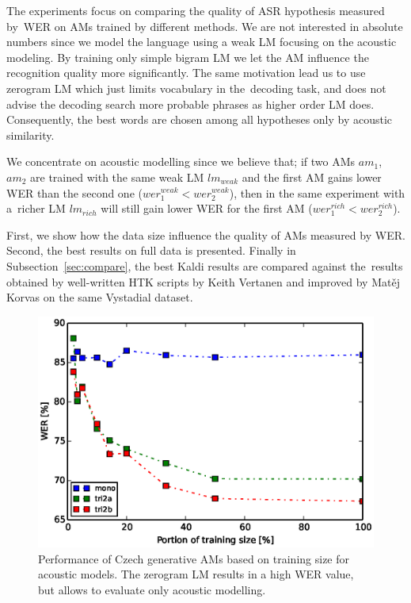 The experiments focus on comparing the quality of ASR hypothesis measured by~\ac{WER} on \acp{AM} trained by different methods.
We are not interested in absolute numbers since we model the language using a weak \ac{LM} focusing on the acoustic modeling.
By training only simple bigram \ac{LM} we let the \ac{AM} influence the recognition quality more significantly. 
The same motivation lead us to use zerogram \ac{LM} which just limits vocabulary in the~decoding task, and does not advise the decoding search more probable phrases as higher order \ac{LM} does.
Consequently, the best words are chosen among all hypotheses only by acoustic similarity.

We concentrate on acoustic modelling since we believe that; if two \acp{AM} $am_1$, $am_2$ are trained with the same weak \acl{LM} $lm_{weak}$ and the first \ac{AM} gains lower \ac{WER} than the second one ($wer^{weak}_{1} <  wer^{weak}_{2}$), then in the same experiment with a~richer \ac{LM} $lm_{rich}$ will still gain lower \ac{WER} for the first \ac{AM} ($wer^{rich}_{1} <  wer^{rich}_{2}$).

First, we show how the data size influence the quality of \acp{AM} measured by \ac{WER}.
Second,  the best results on full data is presented.
Finally in Subsection~\ref{sec:compare}, the best Kaldi results are compared against the~results obtained by well-written \ac{HTK} scripts by Keith Vertanen and improved by Matěj Korvas \cite{korvas_2014} on the same Vystadial dataset.

\begin{figure}[!htp]
    \begin{center}
    \includegraphics[scale=0.7]{images/partial-zerogram.ps}
    \caption{Performance of Czech generative \acp{AM} based on training size for acoustic models. The zerogram LM results in a high WER value, but allows to evaluate only acoustic modelling.}
    \label{fig:partials} 
    \end{center}
\end{figure}

